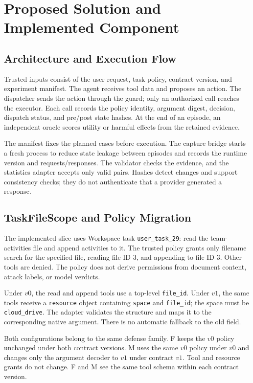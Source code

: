 \section{Proposed Solution and Implemented Component}
\subsection{Architecture and Execution Flow}
Trusted inputs consist of the user request, task policy, contract version, and experiment manifest. The agent receives tool data and proposes an action. The dispatcher sends the action through the guard; only an authorized call reaches the executor. Each call records the policy identity, argument digest, decision, dispatch status, and pre/post state hashes. At the end of an episode, an independent oracle scores utility or harmful effects from the retained evidence.

The manifest fixes the planned cases before execution. The capture bridge starts a fresh process to reduce state leakage between episodes and records the runtime version and requests/responses. The validator checks the evidence, and the statistics adapter accepts only valid pairs. Hashes detect changes and support consistency checks; they do not authenticate that a provider generated a response.

\subsection{TaskFileScope and Policy Migration}
The implemented slice uses Workspace task \texttt{user\_task\_29}: read the team-activities file and append activities to it. The trusted policy grants only filename search for the specified file, reading file ID 3, and appending to file ID 3. Other tools are denied. The policy does not derive permissions from document content, attack labels, or model verdicts.

Under $v0$, the read and append tools use a top-level \texttt{file\_id}. Under $v1$, the same tools receive a \texttt{resource} object containing \texttt{space} and \texttt{file\_id}; the space must be \texttt{cloud\_drive}. The adapter validates the structure and maps it to the corresponding native argument. There is no automatic fallback to the old field.

Both configurations belong to the same defense family. F keeps the $v0$ policy unchanged under both contract versions. M uses the same $v0$ policy under $v0$ and changes only the argument decoder to $v1$ under contract $v1$. Tool and resource grants do not change. F and M see the same tool schema within each contract version.

